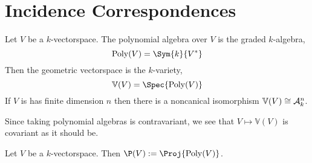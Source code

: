 \documentclass[12pt]{article}
\begin{document}
\section{Incidence Correspondences}

\begin{defn}
Let $V$ be a $k$-vectorspace. The polynomial algebra over $V$ is the graded $k$-algebra,
\[ \mathrm{Poly}(V) = \Sym{k}{V^*} \]
Then the geometric vectorspace is the $k$-variety,
\[ \mathbb{V}(V) = \Spec{\mathrm{Poly}(V)} \]
If $V$ is has finite dimension $n$ then there is a noncanical isomorphism $\mathbb{V}(V) \cong \mathcal{A}^n_k$.
\end{defn}

\begin{rmk}
Since taking polynomial algebras is contravariant, we see that $V \mapsto \mathbb{V}(V)$ is covariant as it should be.
\end{rmk}

\begin{defn}
Let $V$ be a $k$-vectorspace. Then $\P(V) := \Proj{\mathrm{Poly}(V)}$. 
\end{defn}
\end{document}
